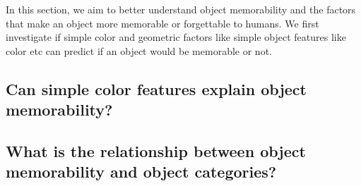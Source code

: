 In this section, we aim to better understand object memorability and the factors that make an object more memorable or forgettable to humans. We first investigate if simple color and geometric factors like simple object features like color etc can predict if an object would be memorable or not. 

\subsection{Can simple color features explain object memorability?}



\subsection{What is the relationship between object memorability and object categories?}

